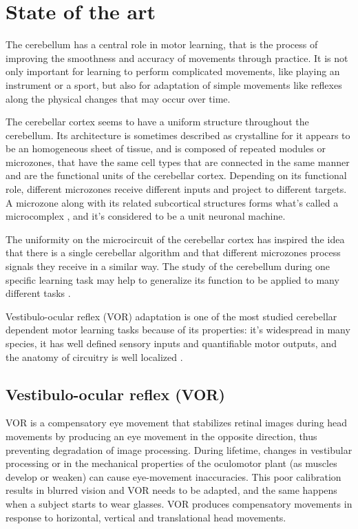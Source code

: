 \documentclass[12pt, a4paper,twoside]{tesi_upf}
\begin{document}
\section{State of the art}

The cerebellum has a central role in motor learning, that is the process of improving the smoothness and accuracy of movements through practice. It is not only important for learning to perform complicated movements, like playing an instrument or a sport, but also for adaptation of simple movements like reflexes along the physical changes that may occur over time.

The cerebellar cortex seems to have a uniform structure throughout the cerebellum. Its architecture is sometimes described as crystalline for it appears to be an homogeneous sheet of tissue, and is composed of repeated modules or microzones, that have the same cell types that are connected in the same manner and are the functional units of the cerebellar cortex. Depending on its functional role, different microzones receive different inputs and project to different targets. A microzone along with its related subcortical structures forms what's called a microcomplex \cite{Ito1982}, and it's considered to be a unit neuronal machine.

The uniformity on the microcircuit of the cerebellar cortex has inspired the idea that there is a single cerebellar algorithm and that different microzones process signals they receive in a similar way. The study of the cerebellum during one specific learning task may help to generalize its function to be applied to many different tasks \cite{Boyden2004}.

Vestibulo-ocular reflex (VOR) adaptation is one of the most studied cerebellar dependent motor learning tasks because of its properties: it's widespread in many species, it has well defined sensory inputs and quantifiable motor outputs, and the anatomy of circuitry is well localized \cite{Ito1982}.

\subsection{Vestibulo-ocular reflex (VOR)}

VOR is a compensatory eye movement that stabilizes retinal images during head movements by producing an eye movement in the opposite direction, thus preventing degradation of image processing. During lifetime, changes in vestibular processing or in the mechanical properties of the oculomotor plant (as muscles develop or weaken) can cause eye-movement inaccuracies. This poor calibration results in blurred vision and VOR needs to be adapted, and the same happens when a subject starts to wear glasses. VOR produces compensatory movements in response to horizontal, vertical and translational head movements.
\end{document}
